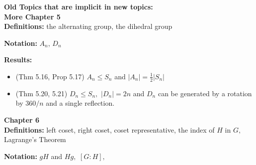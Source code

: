 \documentclass[12pt]{article}
\begin{document}
\hrulefill

\textbf{Old Topics that are implicit in new topics:}\\

\noindent \textbf{More Chapter 5}\\

\noindent \textbf{Definitions:} the alternating group, the dihedral group

\noindent \textbf{Notation:} $A_n$, $D_n$

\noindent \textbf{Results:}
\begin{itemize}
	\item (Thm 5.16, Prop 5.17) $A_n \leq S_n$ and $|A_n| = \frac{1}{2}|S_n|$
	\item (Thm 5.20, 5.21) $D_n \leq S_n,$ $|D_n|=2n$ and $D_n$ can be generated by a rotation by $360/n$ and a single reflection.
\end{itemize}

\noindent \textbf{Chapter 6}\\

\noindent \textbf{Definitions:} left coset, right coset, coset representative, the index of $H$ in $G,$ Lagrange's Theorem

\noindent \textbf{Notation:} $gH$ and $Hg,$ $[G:H],$
\end{document}
